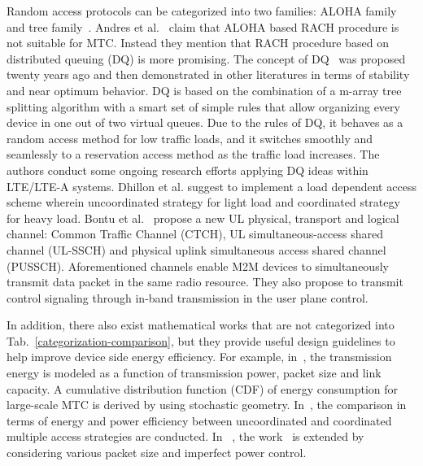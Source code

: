Random access protocols can be categorized into two families: ALOHA family and tree family~\cite{WXu92}. Andres et al.~\cite{laya14} claim that ALOHA based RACH procedure is not suitable for MTC. Instead they mention that  RACH procedure based on distributed queuing (DQ) is more promising. The concept of DQ~\cite{WXu92} was proposed twenty years ago and then demonstrated in other literatures in terms of stability and near optimum behavior. DQ is based on the combination of a m-array tree splitting algorithm with a smart set of simple rules that allow organizing every device in one out of two virtual queues. Due to the rules of DQ, it behaves as a random access method for low traffic loads, and it switches smoothly and seamlessly to a reservation access method as the traffic load increases. The authors conduct some ongoing research efforts applying DQ ideas within LTE/LTE-A systems. Dhillon et al. \cite{Dhi13} suggest to implement a load dependent access scheme wherein uncoordinated strategy for light load and coordinated strategy for heavy load. Bontu et al.~\cite{bontu2014wireless} propose a new UL physical, transport and logical channel: Common Traffic Channel (CTCH), UL simultaneous-access shared channel (UL-SSCH) and physical uplink simultaneous access shared channel (PUSSCH). Aforementioned channels enable M2M devices to simultaneously transmit data packet in the same radio resource. They also propose to transmit control signaling through in-band transmission in the user plane control.
%

In addition, there also exist mathematical works that are not categorized into Tab.~\ref{categorization-comparison}, but they provide useful design guidelines to help improve device side energy efficiency. For example, in~\cite{khoshkholgh2015modeling}, the transmission energy is modeled as a function of transmission power, packet size and link capacity.  A cumulative distribution function (CDF) of energy consumption for large-scale MTC is derived by using stochastic geometry. In~\cite{Dhi13}, the comparison in terms of energy and power efficiency between uncoordinated and coordinated multiple access strategies are conducted. In ~\cite{song2016evaluation}, the work~\cite{Dhi13} is extended by considering various packet size and imperfect power control.


